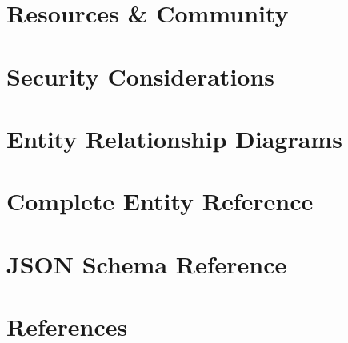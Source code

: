 \documentclass[12pt,a4paper]{article}
\begin{document}
\section{Resources \& Community}
\label{sec:resources-community}


\section{Security Considerations}
\label{sec:security}



\appendix

\section{Entity Relationship Diagrams}
\label{app:erd}


\section{Complete Entity Reference}
\label{app:entity-reference}


\section{JSON Schema Reference}
\label{app:schema-reference}



\newpage
\section*{References}
\end{document}
